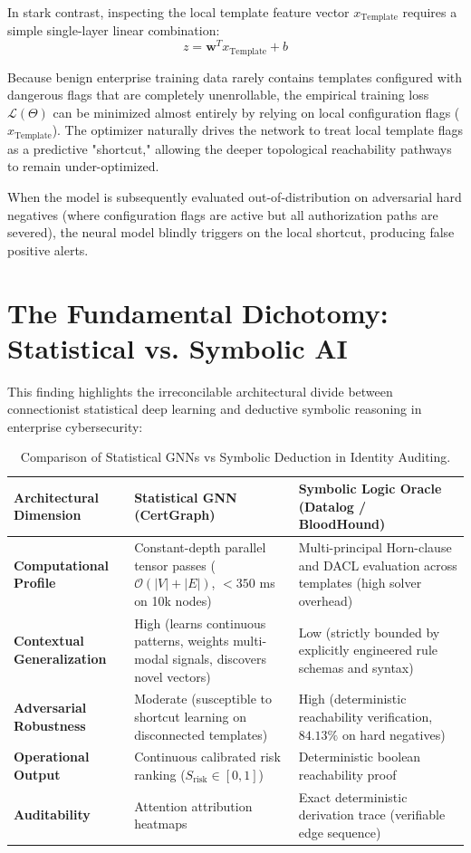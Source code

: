 In stark contrast, inspecting the local template feature vector $x_{\text{Template}}$ requires a simple single-layer linear combination:
\begin{equation}
z = \mathbf{w}^T x_{\text{Template}} + b
\end{equation}

Because benign enterprise training data rarely contains templates configured with dangerous flags that are completely unenrollable, the empirical training loss $\mathcal{L}(\Theta)$ can be minimized almost entirely by relying on local configuration flags ($x_{\text{Template}}$). The optimizer naturally drives the network to treat local template flags as a predictive "shortcut," allowing the deeper topological reachability pathways to remain under-optimized.

When the model is subsequently evaluated out-of-distribution on adversarial hard negatives (where configuration flags are active but all authorization paths are severed), the neural model blindly triggers on the local shortcut, producing false positive alerts.

\section{The Fundamental Dichotomy: Statistical vs. Symbolic AI}
This finding highlights the irreconcilable architectural divide between connectionist statistical deep learning and deductive symbolic reasoning in enterprise cybersecurity:

\begin{table}[ht]
\centering
\small
\caption{Comparison of Statistical GNNs vs Symbolic Deduction in Identity Auditing.}
\label{tab:dichotomy}
\begin{tabularx}{\textwidth}{lXX}
\toprule
\textbf{Architectural Dimension} & \textbf{Statistical GNN (CertGraph)} & \textbf{Symbolic Logic Oracle (Datalog / BloodHound)} \\
\midrule
\textbf{Computational Profile} & Constant-depth parallel tensor passes ($\mathcal{O}(|V| + |E|)$, $< 350$ ms on 10k nodes) & Multi-principal Horn-clause and DACL evaluation across templates (high solver overhead) \\
\textbf{Contextual Generalization} & High (learns continuous patterns, weights multi-modal signals, discovers novel vectors) & Low (strictly bounded by explicitly engineered rule schemas and syntax) \\
\textbf{Adversarial Robustness} & Moderate (susceptible to shortcut learning on disconnected templates) & High (deterministic reachability verification, $84.13\%$ on hard negatives) \\
\textbf{Operational Output} & Continuous calibrated risk ranking ($S_{\text{risk}} \in [0, 1]$) & Deterministic boolean reachability proof \\
\textbf{Auditability} & Attention attribution heatmaps & Exact deterministic derivation trace (verifiable edge sequence) \\
\bottomrule
\end{tabularx}
\end{table}

